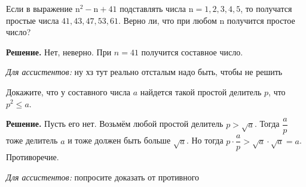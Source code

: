 Если в выражение $\mathrm{n}^2-\mathrm{n}+41$ подставлять числа $\mathrm{n}=1,2,3,4,5$, то получатся простые числа $41,43,47,53,61$. Верно ли, что при любом n получится простое число?

\textbf{Решение.} Нет, неверно. При $n=41$ получится составное число.

\textit{Для ассистентов:} ну хз тут реально отсталым надо быть, чтобы не решить

Докажите, что у составного числа $a$ найдется такой простой делитель $p$, что $p^2 \leqslant a$.

\textbf{Решение.} Пусть его нет. Возьмём любой простой делитель $p > \sqrt{a}$. Тогда $\dfrac{a}{p}$ тоже делитель $a$ и тоже должен быть больше $\sqrt{a}$. Но тогда $p \cdot \dfrac{a}{p} > \sqrt{a} \cdot \sqrt{a} = a$. Противоречие.

\textit{Для ассистентов:} попросите доказать от противного